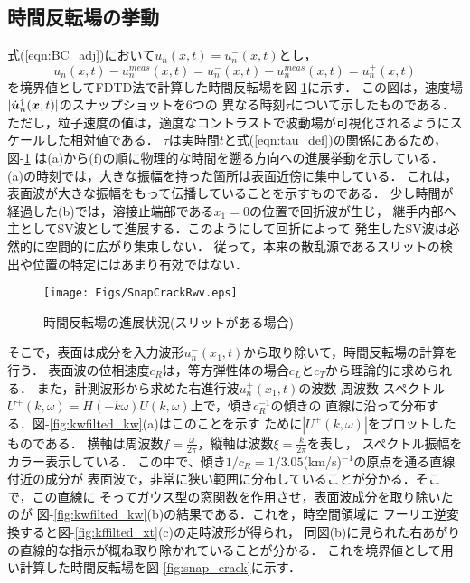 \subsection{時間反転場の挙動}
式(\ref{eqn:BC_adj})において$u_n(x,t)=u_n^-(x,t)$とし，
\begin{equation}
	u_n(x,t) - u_n^{meas}(x,t)
	=
	u_n^-(x,t) - u_n^{meas}(x,t)
	=
	u_n^+(x,t)
	\label{eqn:BC_rwv}
\end{equation}
を境界値としてFDTD法で計算した時間反転場を{\rm 図}-\ref{fig:snap_crack_rwv}に示す．
この図は，速度場$| \dot{\boldsymbol{u}}_n^{\dagger}(\boldsymbol{x},t)|$のスナップショットを6つの
異なる時刻$\tau$について示したものである．
ただし，粒子速度の値は，適度なコントラストで波動場が可視化されるようにスケールした相対値である．
$\tau$は実時間$t$と式(\ref{eqn:tau_def})の関係にあるため，{\rm 図}-\ref{fig:snap_crack_rwv}
は(a)から(f)の順に物理的な時間を遡る方向への進展挙動を示している．
(a)の時刻では，大きな振幅を持った箇所は表面近傍に集中している．
これは，表面波が大きな振幅をもって伝播していることを示すものである．
少し時間が経過した(b)では，溶接止端部である$x_1=0$の位置で回折波が生じ，
継手内部へ主としてSV波として進展する．このようにして回折によって
発生したSV波は必然的に空間的に広がり集束しない．
従って，本来の散乱源であるスリットの検出や位置の特定にはあまり有効ではない．
\begin{figure}
\centering
	\texttt{[image: Figs/SnapCrackRwv.eps]}
	\caption{時間反転場の進展状況(スリットがある場合)}
	\label{fig:snap_crack_rwv}
\end{figure}
そこで，表面は成分を入力波形$u_n^{-}(x_1,t)$から取り除いて，時間反転場の計算を行う．
表面波の位相速度$c_R$は，等方弾性体の場合$c_L$と$c_T$から理論的に求められる．
また，計測波形から求めた右進行波$u_n^+(x_1,t)$の波数-周波数
スペクトル$U^+(k,\omega)=H(-k\omega)U(k,\omega)$上で，傾き$c_R^{-1}$の傾きの
直線に沿って分布する．{\rm 図}-\ref{fig:kwfilted_kw}(a)はこのことを示す
ために$|U^+(k,\omega)|$をプロットしたものである．
横軸は周波数$f=\frac{\omega}{2\pi}$，縦軸は波数$\xi=\frac{k}{2\pi}$を表し，
スペクトル振幅をカラー表示している．
この中で、傾き$1/c_R=1/3.05$(km/s)$^{-1}$の原点を通る直線付近の成分が
表面波で，非常に狭い範囲に分布していることが分かる．そこで，この直線に
そってガウス型の窓関数を作用させ，表面波成分を取り除いたのが
{\rm 図}-\ref{fig:kwfilted_kw}(b)の結果である．これを，時空間領域に
フーリエ逆変換すると{\rm 図}-\ref{fig:kffilted_xt}(c)の走時波形が得られ，
同図(b)に見られた右あがりの直線的な指示が概ね取り除かれていることが分かる．
これを境界値として用い計算した時間反転場を{\rm 図}-\ref{fig:snap_crack}に示す．
